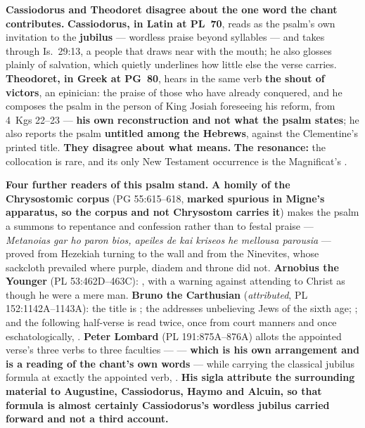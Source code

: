 \textbf{Cassiodorus and Theodoret disagree about the
one word the chant contributes.} \textbf{Cassiodorus, in Latin at PL~70}, reads
 as the psalm's
own invitation to the \textbf{jubilus} --- wordless praise beyond syllables ---
and takes  through Is.~29:13, a people that draws near with the
mouth; he also glosses  plainly of salvation, which quietly
underlines how little else the verse carries. \textbf{Theodoret, in Greek at PG~80}, hears in the same
verb \textbf{the shout of victors}, an epinician: the praise of those who have
already conquered, and he composes the psalm in the person of King Josiah
foreseeing his reform, from 4~Kgs 22--23 --- \textbf{his own reconstruction and
not what the psalm states}; he also reports the psalm \textbf{untitled among
the Hebrews}, against the Clementine's printed title. \textbf{They disagree
about what  means.} \textbf{The 
resonance:} the collocation is rare, and its only New Testament occurrence is
the Magnificat's .

\textbf{Four further readers of this psalm stand.} \textbf{A homily of the
Chrysostomic corpus} (PG 55:615--618, \textbf{marked spurious in Migne's apparatus, so
the corpus and not Chrysostom carries it}) makes the psalm a
summons to repentance and confession rather than to festal praise ---
\emph{Metanoias gar ho paron bios, apeiles de kai kriseos he mellousa
parousia} --- proved from Hezekiah turning to the wall and from the Ninevites,
whose sackcloth prevailed where purple, diadem and throne did not.
\textbf{Arnobius the Younger} (PL 53:462D--463C): , with a warning against
attending to Christ  as though he were a mere man.
\textbf{Bruno the Carthusian} (\emph{attributed}, PL 152:1142A--1143A): the
title is ; the  addresses
unbelieving Jews of the sixth age; ; and the following half-verse is read twice, once
from court manners and once eschatologically, .
\textbf{Peter Lombard} (PL 191:875A--876A) allots the appointed verse's three
verbs to three faculties ---  --- \textbf{which is
his own arrangement and is a reading of the chant's own words} --- while
carrying the classical jubilus formula at exactly the appointed verb,
. \textbf{His sigla attribute the surrounding
material to Augustine, Cassiodorus, Haymo and Alcuin, so that formula is almost
certainly Cassiodorus's wordless jubilus carried forward and not a third
account.}

